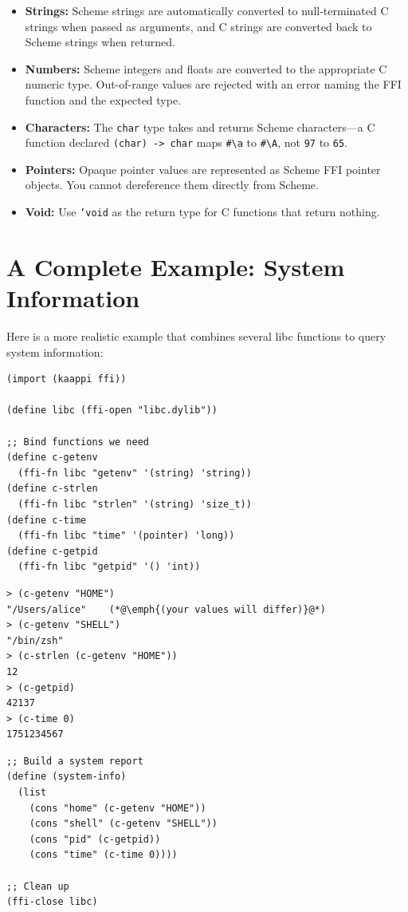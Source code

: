 \begin{itemize}
    \item \textbf{Strings:} Scheme strings are automatically converted to null-terminated C strings when passed as arguments, and C strings are converted back to Scheme strings when returned.
    \item \textbf{Numbers:} Scheme integers and floats are converted to the appropriate C numeric type. Out-of-range values are rejected with an error naming the FFI function and the expected type.
    \item \textbf{Characters:} The \texttt{char} type takes and returns Scheme characters---a C function declared \texttt{(char) -> char} maps \texttt{\#\textbackslash a} to \texttt{\#\textbackslash A}, not \texttt{97} to \texttt{65}.
    \item \textbf{Pointers:} Opaque pointer values are represented as Scheme FFI pointer objects. You cannot dereference them directly from Scheme.
    \item \textbf{Void:} Use \texttt{'void} as the return type for C functions that return nothing.
\end{itemize}

\section{A Complete Example: System Information}

Here is a more realistic example that combines several libc functions to query system information:

\begin{lstlisting}
(import (kaappi ffi))

(define libc (ffi-open "libc.dylib"))

;; Bind functions we need
(define c-getenv
  (ffi-fn libc "getenv" '(string) 'string))
(define c-strlen
  (ffi-fn libc "strlen" '(string) 'size_t))
(define c-time
  (ffi-fn libc "time" '(pointer) 'long))
(define c-getpid
  (ffi-fn libc "getpid" '() 'int))
\end{lstlisting}

\begin{lstlisting}[style=repl]
> (c-getenv "HOME")
"/Users/alice"    (*@\emph{(your values will differ)}@*)
> (c-getenv "SHELL")
"/bin/zsh"
> (c-strlen (c-getenv "HOME"))
12
> (c-getpid)
42137
> (c-time 0)
1751234567
\end{lstlisting}

\begin{lstlisting}
;; Build a system report
(define (system-info)
  (list
    (cons "home" (c-getenv "HOME"))
    (cons "shell" (c-getenv "SHELL"))
    (cons "pid" (c-getpid))
    (cons "time" (c-time 0))))

;; Clean up
(ffi-close libc)
\end{lstlisting}

